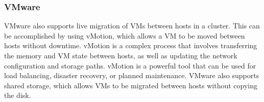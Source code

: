 \subsubsection{VMware}
VMware also supports live migration of VMs between hosts in a cluster. This can be accomplished by using vMotion, which allows a VM to be moved between hosts without downtime. vMotion is a complex process that involves transferring the memory and VM state between hosts, as well as updating the network configuration and storage paths. vMotion is a powerful tool that can be used for load balancing, disaster recovery, or planned maintenance. VMware also supports shared storage, which allows VMs to be migrated between hosts without copying the disk.